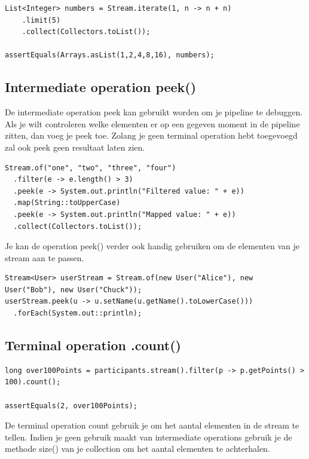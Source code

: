 \begin{lstlisting}
List<Integer> numbers = Stream.iterate(1, n -> n + n)
    .limit(5)
    .collect(Collectors.toList());

assertEquals(Arrays.asList(1,2,4,8,16), numbers);
\end{lstlisting}


\subsection{Intermediate operation peek()}

De intermediate operation peek kan gebruikt worden om je pipeline te debuggen. Als je wilt controleren welke elementen er op een gegeven moment in de pipeline zitten, dan voeg je peek toe. Zolang je geen terminal operation hebt toegevoegd zal ook peek geen resultaat laten zien.

\begin{lstlisting}
Stream.of("one", "two", "three", "four")
  .filter(e -> e.length() > 3)
  .peek(e -> System.out.println("Filtered value: " + e))
  .map(String::toUpperCase)
  .peek(e -> System.out.println("Mapped value: " + e))
  .collect(Collectors.toList());
\end{lstlisting}

Je kan de operation peek() verder ook handig gebruiken om de elementen van je stream aan te passen.

\begin{lstlisting}
Stream<User> userStream = Stream.of(new User("Alice"), new User("Bob"), new User("Chuck"));
userStream.peek(u -> u.setName(u.getName().toLowerCase()))
  .forEach(System.out::println);
  \end{lstlisting}


\subsection{Terminal operation .count()}

\begin{lstlisting}
long over100Points = participants.stream().filter(p -> p.getPoints() > 100).count();

assertEquals(2, over100Points);
\end{lstlisting}
		
De terminal operation count gebruik je om het aantal elementen in de stream te tellen.
Indien je geen gebruik maakt van intermediate operations gebruik je de methode size() van je collection om het aantal elementen te achterhalen.

